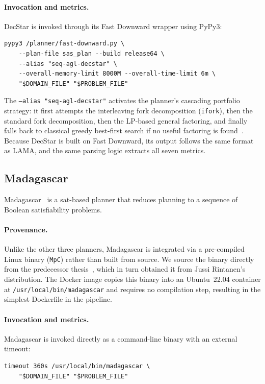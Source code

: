 \paragraph{Invocation and metrics.}
DecStar is invoked through its Fast Downward wrapper using PyPy3:
\begin{lstlisting}[language={}, basicstyle=\small\ttfamily, numbers=none, frame=none, xleftmargin=0.5cm, breaklines=true]
pypy3 /planner/fast-downward.py \
    --plan-file sas_plan --build release64 \
    --alias "seq-agl-decstar" \
    --overall-memory-limit 8000M --overall-time-limit 6m \
    "$DOMAIN_FILE" "$PROBLEM_FILE"
\end{lstlisting}

The \texttt{--alias "seq-agl-decstar"} activates the planner's cascading portfolio strategy: it first attempts the interleaving fork decomposition (\texttt{ifork}), then the standard fork decomposition, then the LP-based general factoring, and finally falls back to classical greedy best-first search if no useful factoring is found~\cite{GnadHoffmann2018}.
Because DecStar is built on Fast Downward, its output follows the same format as LAMA, and the same parsing logic extracts all seven metrics.


\subsection{Madagascar}
\label{sec:impl:madagascar}

Madagascar~\cite{Rintanen2012} is a \gls{sat}-based planner that reduces planning to a sequence of Boolean satisfiability problems.

\paragraph{Provenance.}
Unlike the other three planners, Madagascar is integrated via a pre-compiled Linux binary (\texttt{MpC}) rather than built from source.
We source the binary directly from the predecessor thesis~\cite{Elis2025}, which in turn obtained it from Jussi Rintanen's distribution.
The Docker image copies this binary into an Ubuntu~22.04 container at \texttt{/usr/local/bin/madagascar} and requires no compilation step, resulting in the simplest Dockerfile in the pipeline.

\paragraph{Invocation and metrics.}
Madagascar is invoked directly as a command-line binary with an external timeout:
\begin{lstlisting}[language={}, basicstyle=\small\ttfamily, numbers=none, frame=none, xleftmargin=0.5cm, breaklines=true]
timeout 360s /usr/local/bin/madagascar \
    "$DOMAIN_FILE" "$PROBLEM_FILE"
\end{lstlisting}


